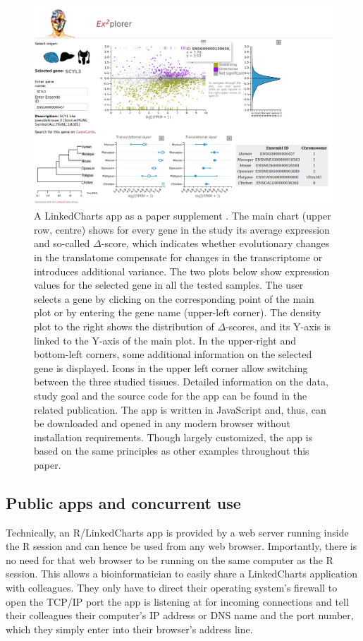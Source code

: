 \documentclass[twocolumn,10pt]{article}
\begin{document}
\begin{figure}[t]
   \includegraphics[width=\textwidth]{FigF/figF.png}
   \caption{A LinkedCharts app as a paper supplement \cite{wang_2020}. The main chart (upper row, centre) shows for every gene in the study its average expression and so-called $\Delta$-score, which indicates whether evolutionary changes in the translatome compensate for changes in the transcriptome or introduces additional variance. The two plots below show expression values for the selected gene in all the tested samples. The user selects a gene by clicking on the corresponding point of the main plot or by entering the gene name (upper-left corner). The density plot to the right shows the distribution of $\Delta$-scores, and its Y-axis is linked to the Y-axis of the main plot. In the upper-right and bottom-left corners, some additional information on the selected gene is displayed. Icons in the upper left corner allow switching between the three studied tissues. Detailed information on the data, study goal and the source code for the app can be found in the related publication. The app is written in JavaScript and, thus, can be downloaded and opened in any modern browser without installation requirements. Though largely customized, the app is based on the same principles as other examples throughout this paper.}
   \label{FigF}
\end{figure}

\subsection{Public apps and concurrent use}

Technically, an R/LinkedCharts app is provided by a web server running inside the R session and can hence be used from any web browser. Importantly, there is no need for that web browser to be running on the same computer as the R session. This allows a bioinformatician to easily share a LinkedCharts application with colleagues. They only have to direct their operating system's firewall to open the TCP/IP port the app is listening at for incoming connections and tell their colleagues their computer's IP address or DNS name and the port number, which they simply enter into their browser's address line.
\end{document}
